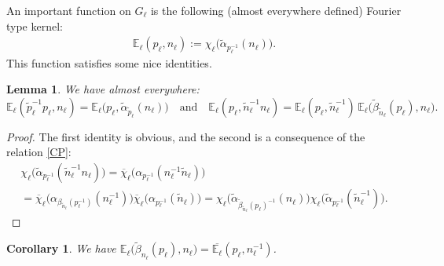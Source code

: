 \documentclass[a4paper,11pt,reqno]{amsart}
\numberwithin{equation}{section}
\newtheorem{corollary}[theorem]{Corollary}
\newtheorem{lemma}[theorem]{Lemma}
\theoremstyle{remark}
\theoremstyle{definition}
\newcommand{\E}{\mathbb E}
\begin{document}
An important function on $G_\ell$ is the following (almost  everywhere defined) Fourier type kernel:
\begin{align}
\label{FTK}
\E_\ell(p_\ell ,n_\ell):=\chi_\ell\big(\tilde\alpha_{ p_\ell^{-1}}(n_\ell)\big).
\end{align}
This function satisfies some nice identities.
\begin{lemma}
\label{SE}
We have  almost everywhere:
$$
\E_\ell(\tilde p_\ell^{-1}p_\ell,n_\ell)=\E_\ell\big(p_\ell,\tilde\alpha_{\tilde p_\ell}(n_\ell)\big)\quad\mbox{and}\quad
\E_\ell(p_\ell,\tilde n_\ell^{-1}n_\ell)=\E_\ell(p_\ell,\tilde n_\ell^{-1})\,\E_\ell\big(\tilde\beta_{\tilde n_\ell}(p_\ell),n_\ell\big).
$$
\end{lemma}
\begin{proof}
The first identity is obvious, and the second is a  consequence of the relation  \eqref{CP}:
\begin{multline*}
\chi_\ell\big(\tilde\alpha_{ p_\ell^{-1}}(\tilde n_\ell^{-1}n_\ell)\big)=\overline{\chi}_\ell\big(\alpha_{ p_\ell^{-1}}( n_\ell^{-1}\tilde n_\ell)\big)\\
=\overline{\chi}_\ell\big(\alpha_{ \beta_{\tilde n_\ell}(p_\ell^{-1})}( n_\ell^{-1})\big)\overline{\chi}_\ell\big(\alpha_{ p_\ell^{-1}}(\tilde n_\ell)\big)
=\chi_\ell\big(\tilde\alpha_{ \tilde\beta_{\tilde n_\ell}(p_\ell)^{-1}}( n_\ell)\big)\chi_\ell\big(\tilde\alpha_{ p_\ell^{-1}}(\tilde n_\ell^{-1})\big).
\end{multline*}
\end{proof}
\begin{corollary}
We have
$\E_\ell\big(\tilde\beta_{n_\ell}(p_\ell),n_\ell\big)=\overline{\E_\ell}(p_\ell,n_\ell^{-1})$.
\end{corollary}
\end{document}
